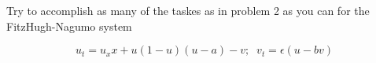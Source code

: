 Try to accomplish as many of the taskes as in problem 2 as you can for the FitzHugh-Nagumo system

$$u_t = u_xx + u(1 - u)(u - a) -v;\;\; v_t = \epsilon(u - bv)$$